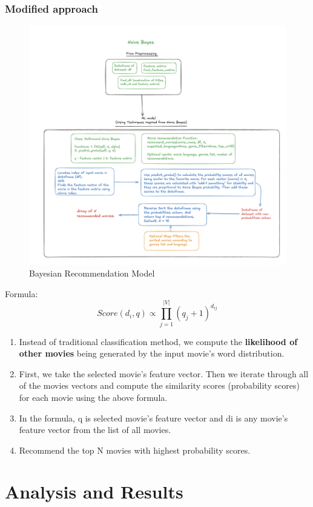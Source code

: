 \documentclass[a4paper]{article}
\theoremstyle{plain}
\begin{document}
\subsubsection{Modified approach}
\begin{figure}[H]
    \centering
    \includegraphics[width=\linewidth]{bay.png}
    \caption{Bayesian Recommendation Model}
    \label{fig:bayesian}
\end{figure}

Formula:
\[
Score(d_i, q) \propto \prod_{j=1}^{|V|} (q_j + 1)^{d_{ij}}
\]
\newline
\begin{enumerate}
    \item Instead of traditional classification method, we compute the \textbf{likelihood of other movies} being generated by the input movie’s word distribution. 
    \item First, we take the selected movie's feature vector. Then we iterate through all of the movies vectors and compute the similarity scores (probability scores) for each movie using the above formula.
    \item In the formula, q is selected movie's feature vector and di is any movie's feature vector from the list of all movies.
    \item Recommend the top N movies with highest probability scores.
\end{enumerate}
\newpage
\section{Analysis and Results}
\label{sec:results}
\end{document}

